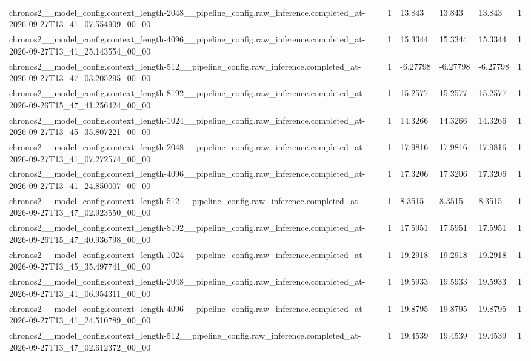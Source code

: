 \begin{tabular}{llllll}
chronos2\_\_model\_config.context\_length-2048\_\_pipeline\_config.raw\_inference.completed\_at-2026-09-27T13\_41\_07.554909\_00\_00 & 1 & 13.843 & 13.843 & 13.843 & 1 \\
chronos2\_\_model\_config.context\_length-4096\_\_pipeline\_config.raw\_inference.completed\_at-2026-09-27T13\_41\_25.143554\_00\_00 & 1 & 15.3344 & 15.3344 & 15.3344 & 1 \\
chronos2\_\_model\_config.context\_length-512\_\_pipeline\_config.raw\_inference.completed\_at-2026-09-27T13\_47\_03.205295\_00\_00 & 1 & -6.27798 & -6.27798 & -6.27798 & 1 \\
chronos2\_\_model\_config.context\_length-8192\_\_pipeline\_config.raw\_inference.completed\_at-2026-09-26T15\_47\_41.256424\_00\_00 & 1 & 15.2577 & 15.2577 & 15.2577 & 1 \\
chronos2\_\_model\_config.context\_length-1024\_\_pipeline\_config.raw\_inference.completed\_at-2026-09-27T13\_45\_35.807221\_00\_00 & 1 & 14.3266 & 14.3266 & 14.3266 & 1 \\
chronos2\_\_model\_config.context\_length-2048\_\_pipeline\_config.raw\_inference.completed\_at-2026-09-27T13\_41\_07.272574\_00\_00 & 1 & 17.9816 & 17.9816 & 17.9816 & 1 \\
chronos2\_\_model\_config.context\_length-4096\_\_pipeline\_config.raw\_inference.completed\_at-2026-09-27T13\_41\_24.850007\_00\_00 & 1 & 17.3206 & 17.3206 & 17.3206 & 1 \\
chronos2\_\_model\_config.context\_length-512\_\_pipeline\_config.raw\_inference.completed\_at-2026-09-27T13\_47\_02.923550\_00\_00 & 1 & 8.3515 & 8.3515 & 8.3515 & 1 \\
chronos2\_\_model\_config.context\_length-8192\_\_pipeline\_config.raw\_inference.completed\_at-2026-09-26T15\_47\_40.936798\_00\_00 & 1 & 17.5951 & 17.5951 & 17.5951 & 1 \\
chronos2\_\_model\_config.context\_length-1024\_\_pipeline\_config.raw\_inference.completed\_at-2026-09-27T13\_45\_35.497741\_00\_00 & 1 & 19.2918 & 19.2918 & 19.2918 & 1 \\
chronos2\_\_model\_config.context\_length-2048\_\_pipeline\_config.raw\_inference.completed\_at-2026-09-27T13\_41\_06.954311\_00\_00 & 1 & 19.5933 & 19.5933 & 19.5933 & 1 \\
chronos2\_\_model\_config.context\_length-4096\_\_pipeline\_config.raw\_inference.completed\_at-2026-09-27T13\_41\_24.510789\_00\_00 & 1 & 19.8795 & 19.8795 & 19.8795 & 1 \\
chronos2\_\_model\_config.context\_length-512\_\_pipeline\_config.raw\_inference.completed\_at-2026-09-27T13\_47\_02.612372\_00\_00 & 1 & 19.4539 & 19.4539 & 19.4539 & 1 \\

\end{tabular}
